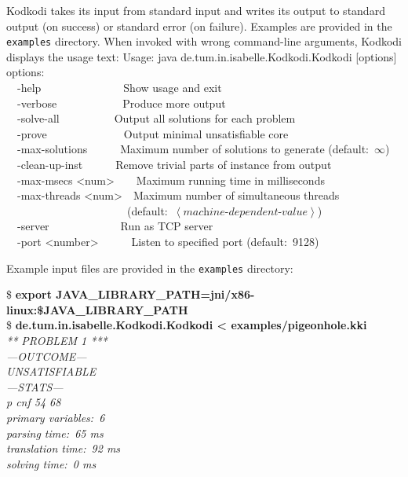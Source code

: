 \documentclass[a4paper,12pt]{article}
\begin{document}
Kodkodi takes its input from standard input and writes its output to standard
output (on success) or standard error (on failure). Examples are provided in the
\texttt{examples} directory. When invoked with wrong command-line arguments,
Kodkodi displays the usage text:
%
\pre
\ttfamily\small
Usage: java de.tum.in.isabelle.Kodkodi.Kodkodi [options] \\
options: \\
\hbox{}~~-help~~~~~~~~~~~~~~~Show usage and exit \\
\hbox{}~~-verbose~~~~~~~~~~~~Produce more output \\
\hbox{}~~-solve-all~~~~~~~~~~Output all solutions for each problem \\
\hbox{}~~-prove~~~~~~~~~~~~~~Output minimal unsatisfiable core \\
\hbox{}~~-max-solutions~~~~~~Maximum number of solutions to generate (default:~$\infty$) \\
\hbox{}~~-clean-up-inst~~~~~~Remove trivial parts of instance from output \\
\hbox{}~~-max-msecs <num>~~~~Maximum running time in milliseconds \\
\hbox{}~~-max-threads <num>~~Maximum number of simultaneous threads \\ \hbox{}~~~~~~~~~~~~~~~~~~~~~~(default:~$\left<\textit{machine-dependent-value}\right>$) \\
\hbox{}~~-server~~~~~~~~~~~~~Run as TCP server \\
\hbox{}~~-port <number>~~~~~~Listen to specified port (default:~9128)
\post

Example input files are provided in the \texttt{examples} directory:

\pre
\ttfamily\small
\$ \textbf{export JAVA\_LIBRARY\_PATH=jni/x86-linux:\$JAVA\_LIBRARY\_PATH} \\
\$ \textbf{de.tum.in.isabelle.Kodkodi.Kodkodi < examples/pigeonhole.kki} \\
\slshape *** PROBLEM 1 *** \\[2\smallskipamount]
---OUTCOME--- \\
UNSATISFIABLE \\[2\smallskipamount]
---STATS--- \\
p cnf 54 68 \\
primary variables:~6 \\
parsing time:~65 ms \\
translation time:~92 ms \\
solving time:~0 ms
\post
\end{document}
